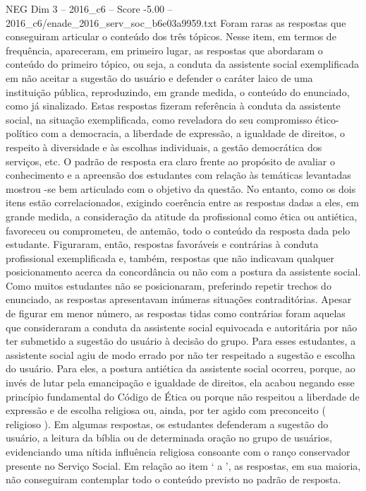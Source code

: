 \begin{textsample}{NEG Dim 3 – 2016\_c6 – Score -5.00 – 2016\_c6/enade\_2016\_serv\_soc\_b6e03a9959.txt}
Foram raras as respostas que conseguiram articular o conteúdo dos três tópicos.
Nesse item, em termos de frequência, apareceram, em primeiro lugar, as respostas que abordaram o conteúdo do primeiro tópico, ou seja, a conduta da assistente social exemplificada em não aceitar a sugestão do usuário e defender o caráter laico de uma instituição pública, reproduzindo, em grande medida, o conteúdo do enunciado, como já sinalizado.
Estas respostas fizeram referência à conduta da assistente social, na situação exemplificada, como reveladora do seu compromisso ético-político com a democracia, a liberdade de expressão, a igualdade de direitos, o respeito à diversidade e às escolhas individuais, a gestão democrática dos serviços, etc.
O padrão de resposta era claro frente ao propósito de avaliar o conhecimento e a apreensão dos estudantes com relação às temáticas levantadas mostrou -se bem articulado com o objetivo da questão.
No entanto, como os dois itens estão correlacionados, exigindo coerência entre as respostas dadas a eles, em grande medida, a consideração da atitude da profissional como ética ou antiética, favoreceu ou comprometeu, de antemão, todo o conteúdo da resposta dada pelo estudante.
Figuraram, então, respostas favoráveis e contrárias à conduta profissional exemplificada e, também, respostas que não indicavam qualquer posicionamento acerca da concordância ou não com a postura da assistente social.
Como muitos estudantes não se posicionaram, preferindo repetir trechos do enunciado, as respostas apresentavam inúmeras situações contraditórias.
Apesar de figurar em menor número, as respostas tidas como contrárias foram aquelas que consideraram a conduta da assistente social equivocada e autoritária por não ter submetido a sugestão do usuário à decisão do grupo.
Para esses estudantes, a assistente social agiu de modo errado por não ter respeitado a sugestão e escolha do usuário.
Para eles, a postura antiética da assistente social ocorreu, porque, ao invés de lutar pela emancipação e igualdade de direitos, ela acabou negando esse princípio fundamental do Código de Ética ou porque não respeitou a liberdade de expressão e de escolha religiosa ou, ainda, por ter agido com preconceito ( religioso ).
Em algumas respostas, os estudantes defenderam a sugestão do usuário, a leitura da bíblia ou de determinada oração no grupo de usuários, evidenciando uma nítida influência religiosa consoante com o ranço conservador presente no Serviço Social.
Em relação ao item ‘ a ’, as respostas, em sua maioria, não conseguiram contemplar todo o conteúdo previsto no padrão de resposta.

\end{textsample}
